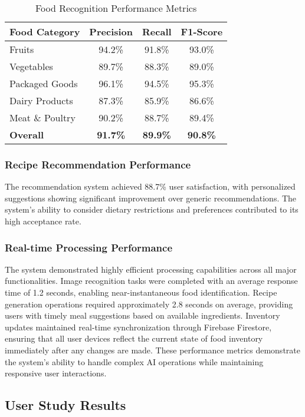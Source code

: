 \documentclass[conference]{IEEEtran}
\begin{document}
\begin{table}[htbp]
\caption{Food Recognition Performance Metrics}
\label{tab:recognition_metrics}
\centering
\begin{tabular}{|l|c|c|c|}
\hline
\textbf{Food Category} & \textbf{Precision} & \textbf{Recall} & \textbf{F1-Score} \\
\hline
Fruits & 94.2\% & 91.8\% & 93.0\% \\
Vegetables & 89.7\% & 88.3\% & 89.0\% \\
Packaged Goods & 96.1\% & 94.5\% & 95.3\% \\
Dairy Products & 87.3\% & 85.9\% & 86.6\% \\
Meat \& Poultry & 90.2\% & 88.7\% & 89.4\% \\
\hline
\textbf{Overall} & \textbf{91.7\%} & \textbf{89.9\%} & \textbf{90.8\%} \\
\hline
\end{tabular}
\end{table}

\subsubsection{Recipe Recommendation Performance}
The recommendation system achieved 88.7\% user satisfaction, with personalized suggestions showing significant improvement over generic recommendations. The system's ability to consider dietary restrictions and preferences contributed to its high acceptance rate.

\subsubsection{Real-time Processing Performance}
The system demonstrated highly efficient processing capabilities across all major functionalities. Image recognition tasks were completed with an average response time of 1.2 seconds, enabling near-instantaneous food identification. Recipe generation operations required approximately 2.8 seconds on average, providing users with timely meal suggestions based on available ingredients. Inventory updates maintained real-time synchronization through Firebase Firestore, ensuring that all user devices reflect the current state of food inventory immediately after any changes are made. These performance metrics demonstrate the system's ability to handle complex AI operations while maintaining responsive user interactions.

\subsection{User Study Results}
\end{document}
